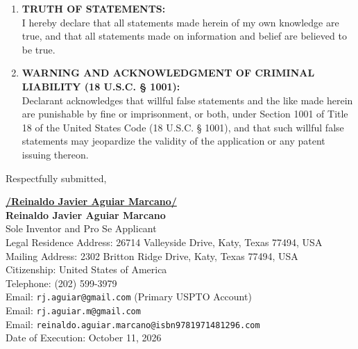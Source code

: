 \documentclass[11pt,letterpaper]{article}
\begin{document}
\begin{enumerate}[leftmargin=*, resume, itemsep=0.6em, topsep=0.2em]
    \item \textbf{TRUTH OF STATEMENTS:} \\
    I hereby declare that all statements made herein of my own knowledge are true, and that all statements made on information and belief are believed to be true.

    \item \textbf{WARNING AND ACKNOWLEDGMENT OF CRIMINAL LIABILITY (18 U.S.C. \S{} 1001):} \\
    Declarant acknowledges that willful false statements and the like made herein are punishable by fine or imprisonment, or both, under Section 1001 of Title 18 of the United States Code (18 U.S.C. \S{} 1001), and that such willful false statements may jeopardize the validity of the application or any patent issuing thereon.
\end{enumerate}

\vspace{0.6cm}
\begin{singlespace}
\noindent Respectfully submitted, \par\vspace{0.6cm}
\underline{\textbf{/Reinaldo Javier Aguiar Marcano/}} \\
\textbf{Reinaldo Javier Aguiar Marcano} \\
Sole Inventor and Pro Se Applicant \\
Legal Residence Address: 26714 Valleyside Drive, Katy, Texas 77494, USA \\
Mailing Address: 2302 Britton Ridge Drive, Katy, Texas 77494, USA \\
Citizenship: United States of America \\
Telephone: (202) 599-3979 \\
Email: \texttt{rj.aguiar@gmail.com} (Primary USPTO Account) \\
Email: \texttt{rj.aguiar.m@gmail.com} \\
Email: \texttt{reinaldo.aguiar.marcano@isbn9781971481296.com} \\
Date of Execution: October 11, 2026
\end{singlespace}
\end{document}
